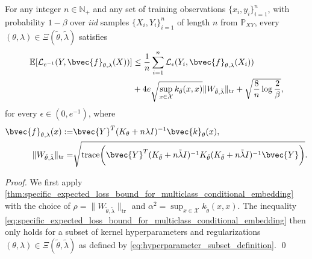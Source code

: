 \documentclass[runningheads, envcountsame, a4paper]{llncs}
\begin{document}
			\begin{lemma}
				\label{thm:general_expected_risk_bound_hyperparameter_learning}
				For any integer $n \in \mathbb{N}_{+}$ and any set of training observations $\{x_{i}, y_{i}\}_{i = 1}^{n}$, with probability $1 - \beta$ over \textit{iid} samples $\{X_{i}, Y_{i}\}_{i = 1}^{n}$ of length $n$ from $\mathbb{P}_{X Y}$, every $(\theta, \lambda) \in \Xi(\tilde{\theta}, \tilde{\lambda})$ satisfies
				\begin{equation}
				\begin{aligned}
					\mathbb{E}[\mathcal{L}_{e^{-1}}(Y, \bvec{f}_{\theta, \lambda}(X))] &\leq \frac{1}{n} \sum_{i = 1}^{n} \mathcal{L}_{\epsilon}(Y_{i}, \bvec{f}_{\theta, \lambda}(X_{i})) \\
					&+ 4 e \sqrt{\sup_{x \in \mathcal{X}} k_{\tilde{\theta}}(x, x)} \| W_{\tilde{\theta}, \tilde{\lambda}} \|_{\mathrm{tr}} + \sqrt{\frac{8}{n} \log{\frac{2}{\beta}}},
				\label{eq:general_expected_risk_bound_hyperparameter_learning}
				\end{aligned}
				\end{equation}
				for every $\epsilon \in (0, e^{-1})$, where 
				\begin{equation}
				\begin{aligned}
					\bvec{f}_{\theta, \lambda}(x) :=& \bvec{Y}^{T} (K_{\theta} + n \lambda I)^{-1} \bvec{k}_{\theta}(x), \\
					\| W_{\tilde{\theta}, \tilde{\lambda}} \|_{\mathrm{tr}} =& \sqrt{\mathrm{trace}\bigg(\bvec{Y}^{T} (K_{\tilde{\theta}} + n \tilde{\lambda} I)^{-1} K_{\tilde{\theta}} (K_{\tilde{\theta}} + n \tilde{\lambda} I)^{-1} \bvec{Y}\bigg)}.
				\end{aligned}
				\end{equation}
			\end{lemma}
	
			\begin{proof}
				We first apply \cref{thm:specific_expected_loss_bound_for_multiclass_conditional_embedding} with the choice of $\rho = \| W_{\tilde{\theta}, \tilde{\lambda}} \|_{\mathrm{tr}}$ and $\alpha^{2} = \sup_{x \in \mathcal{X}} k_{\tilde{\theta}}(x, x)$. The inequality \eqref{eq:specific_expected_loss_bound_for_multiclass_conditional_embedding} then only holds for a subset of kernel hyperparameters and regularizations $(\theta, \lambda) \in \Xi(\tilde{\theta}, \tilde{\lambda})$ as defined by \eqref{eq:hyperparameter_subset_definition}.
				\qed
			\end{proof}
		
\end{document}
